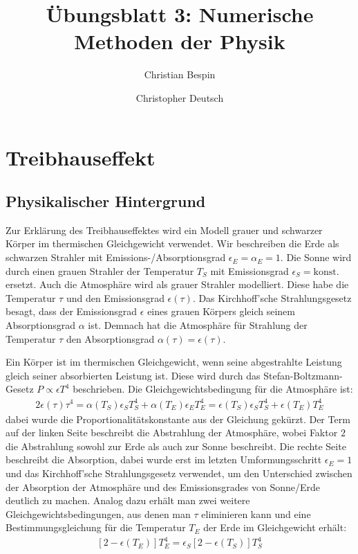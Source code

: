 \documentclass[10pt,a4paper]{article}
\author{Christian Bespin \and Christopher Deutsch}
\title{Übungsblatt 3: Numerische Methoden der Physik}
\begin{document}
\maketitle

\setcounter{section}{1}

\section{Treibhauseffekt}

\subsection{Physikalischer Hintergrund}
Zur Erklärung des Treibhauseffektes wird ein Modell grauer und schwarzer Körper
im thermischen Gleichgewicht verwendet. Wir beschreiben die Erde als schwarzen
Strahler mit Emissions-/Absorptionsgrad $\epsilon_E = \alpha_E = 1$. Die Sonne 
wird durch einen grauen Strahler der Temperatur $T_S$ mit Emissionsgrad
$\epsilon_S = \text{konst.}$ ersetzt.
Auch die Atmosphäre wird als grauer Strahler modelliert. Diese habe die
Temperatur $\tau$ und den Emissionsgrad $\epsilon(\tau)$. 
Das Kirchhoff'sche Strahlungsgesetz besagt, dass der Emissionsgrad $\epsilon$ eines
grauen Körpers gleich seinem Absorptionsgrad $\alpha$ ist. Demnach hat die
Atmosphäre für Strahlung der Temperatur $\tau$ den Absorptionsgrad $\alpha(\tau) = \epsilon(\tau)$.

Ein Körper ist im thermischen Gleichgewicht, wenn seine abgestrahlte Leistung
gleich seiner absorbierten Leistung ist. Diese wird durch das Stefan-Boltzmann-Gesetz
$P \propto \epsilon T^4$ beschrieben. Die Gleichgewichtsbedingung für die Atmosphäre ist:
\begin{align}
	2\epsilon(\tau)\tau^4 = \alpha(T_S) \epsilon_S T_S^4 + \alpha(T_E) \epsilon_E T_E^4 = \epsilon(T_S) \epsilon_S T_S^4 + \epsilon(T_E) T_E^4
\end{align}
dabei wurde die Proportionalitätskonstante aus der Gleichung gekürzt.
Der Term auf der linken Seite beschreibt die Abstrahlung der Atmosphäre, wobei
Faktor $2$ die Abstrahlung sowohl zur Erde als auch zur Sonne beschreibt.
Die rechte Seite beschreibt die Absorption, dabei wurde erst im letzten
Umformungsschritt $\epsilon_E = 1$ und das Kirchhoff'sche Strahlungsgesetz verwendet,
um den Unterschied zwischen der Absorption der Atmosphäre und des Emissionsgrades von
Sonne/Erde deutlich zu machen.
Analog dazu erhält man zwei weitere Gleichgewichtsbedingungen, aus denen man
$\tau$ eliminieren kann und eine Bestimmungsgleichung für die Temperatur $T_E$
der Erde im Gleichgewicht erhält:
\begin{align}
\left[2-\epsilon(T_E)\right]T_E^4=\epsilon_S\left[2-\epsilon(T_S)\right]T_S^4
\end{align}
\end{document}
